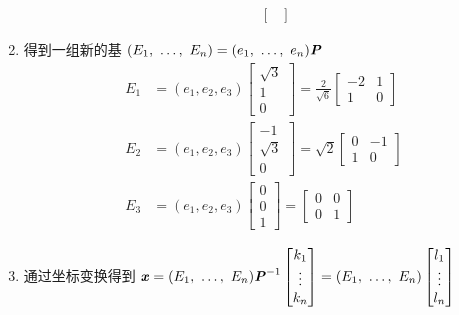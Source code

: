 \begin{solution}
\begin{enumerate}
\begin{enumerate}
\begin{align*}
\begin{bmatrix}
                                \end{bmatrix}
                            \end{align*}
                    \end{enumerate}
                    \item 得到一组新的基 $(E_1, \ \dots, \ E_n) = (e_1, \ \dots, \ e_n)\textbf{\textit{P}}$
                        \begin{align*}
                            E_1 &= (e_1, e_2, e_3)\begin{bmatrix}
                                \sqrt{3} \\ 1 \\ 0
                            \end{bmatrix} = \frac{2}{\sqrt{6}}\begin{bmatrix}
                                -2 & 1 \\ 1 & 0
                            \end{bmatrix} \\ E_2 &= (e_1, e_2, e_3)\begin{bmatrix}
                                -1 \\ \sqrt{3} \\ 0
                            \end{bmatrix} = \sqrt{2}\begin{bmatrix}
                                0 & -1 \\ 1 & 0
                            \end{bmatrix} \\ E_3 &= (e_1, e_2, e_3)\begin{bmatrix}
                                0 \\ 0 \\ 1
                            \end{bmatrix} = \begin{bmatrix}
                                0 & 0 \\ 0 & 1
                            \end{bmatrix}
                        \end{align*}
                    \item 通过坐标变换得到 $\textbf{\textit{x}} = (E_1, \ \dots, \ E_n)\textbf{\textit{P}}^{-1}\begin{bmatrix} k_1 \\ \vdots \\ k_n \end{bmatrix} = (E_1, \ \dots, \ E_n)\begin{bmatrix} l_1 \\ \vdots \\ l_n \end{bmatrix}$

\end{enumerate}
\end{solution}
